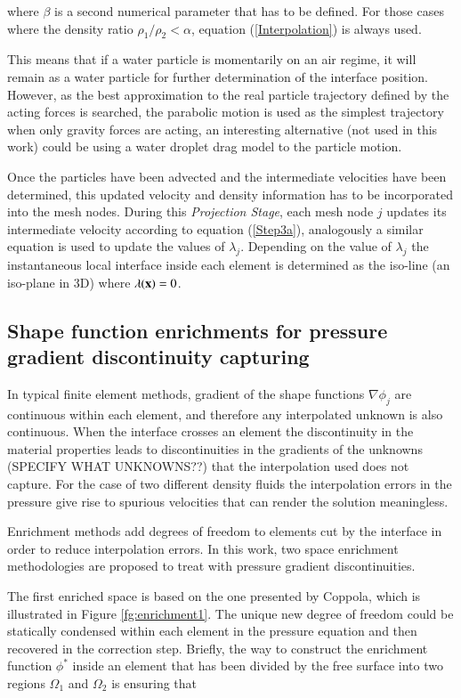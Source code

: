  where $\beta$ is a second numerical parameter that has to be defined. For those cases where the density ratio $\rho_1/\rho_2<\alpha$, equation (\ref{Interpolation}) is always used.

This means that if a water particle is momentarily on an air regime, it will remain as a water particle for further determination of the interface position. However, as the best approximation to the real particle trajectory defined by the acting forces is searched, the parabolic motion is used as the simplest trajectory when only gravity forces are acting, an interesting alternative (not used in this work) could be using a water droplet drag model to the particle motion.

Once the particles have been advected and the intermediate velocities have been determined, this updated velocity and density information has to be incorporated into the mesh nodes. During this \textit{Projection Stage}, each mesh node $j$ updates its intermediate velocity according to equation (\ref{Step3a}), analogously a similar equation is used to update the values of $\lambda_j$. Depending on the value of $\lambda_j$ the instantaneous local interface inside each element is determined as the iso-line (an iso-plane in 3D) where $\lambda(\mathbf{x})=0$.

\subsection{Shape function enrichments for pressure gradient discontinuity capturing}

In typical finite element methods, gradient of the shape functions $\nabla\phi_j$ are continuous within each element, and therefore any interpolated unknown is also continuous. When the interface crosses an element the discontinuity in the material properties leads to discontinuities in the gradients of the unknowns (SPECIFY WHAT UNKNOWNS??) that the interpolation used does not capture. For the case of two different density fluids the interpolation errors in the pressure give rise to spurious velocities that can render the solution meaningless.

Enrichment methods add degrees of freedom to elements cut by the interface in order to reduce interpolation errors. In this work, two space enrichment methodologies are proposed to treat with pressure gradient discontinuities.

The first enriched space is based on the one presented by Coppola\cite{Coppola05}, which is illustrated in Figure \ref{fg:enrichment1}. The unique new degree of freedom could be statically condensed within each element in the pressure equation and then recovered in the correction step. Briefly, the way to construct the enrichment function $\phi^*$ inside an element that has been divided by the free surface into two regions $\Omega_1$ and $\Omega_2$ is ensuring that

